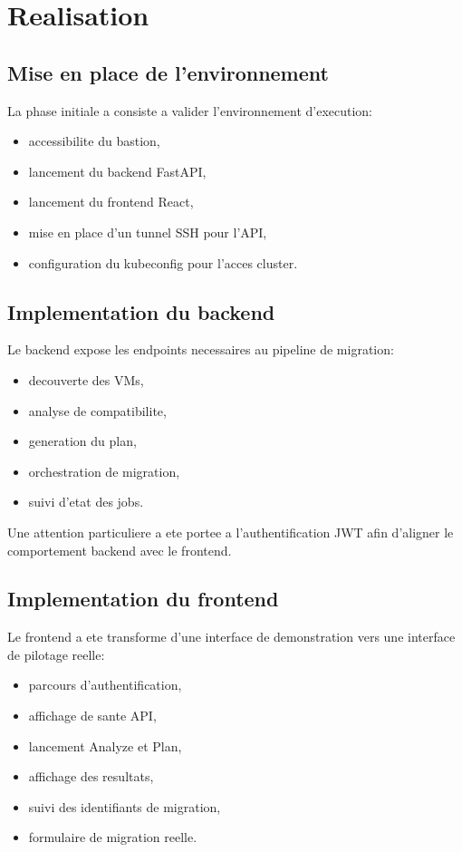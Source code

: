 ﻿\chapter{Realisation}

\section{Mise en place de l'environnement}
La phase initiale a consiste a valider l'environnement d'execution:
\begin{itemize}[leftmargin=1.2cm]
  \item accessibilite du bastion,
  \item lancement du backend FastAPI,
  \item lancement du frontend React,
  \item mise en place d'un tunnel SSH pour l'API,
  \item configuration du kubeconfig pour l'acces cluster.
\end{itemize}

\section{Implementation du backend}
Le backend expose les endpoints necessaires au pipeline de migration:
\begin{itemize}[leftmargin=1.2cm]
  \item decouverte des VMs,
  \item analyse de compatibilite,
  \item generation du plan,
  \item orchestration de migration,
  \item suivi d'etat des jobs.
\end{itemize}

Une attention particuliere a ete portee a l'authentification JWT afin d'aligner le comportement backend avec le frontend.

\section{Implementation du frontend}
Le frontend a ete transforme d'une interface de demonstration vers une interface de pilotage reelle:
\begin{itemize}[leftmargin=1.2cm]
  \item parcours d'authentification,
  \item affichage de sante API,
  \item lancement Analyze et Plan,
  \item affichage des resultats,
  \item suivi des identifiants de migration,
  \item formulaire de migration reelle.
\end{itemize}


